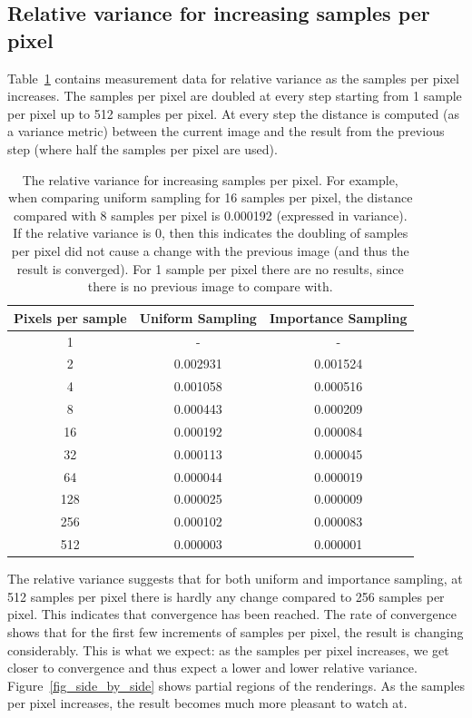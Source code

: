 \documentclass[11pt,a4paper]{report}
\begin{document}
\subsection{Relative variance for increasing samples per pixel}

Table~\ref{table_relative_variance} contains measurement data for relative variance as the samples per pixel increases. The samples per pixel are doubled at every step starting from 1 sample per pixel up to 512 samples per pixel. At every step the distance is computed (as a variance metric) between the current image and the result from the previous step (where half the samples per pixel are used).



\begin{table}
\begin{center}
\begin{tabular}{c|c|c}
Pixels per sample & Uniform Sampling & Importance Sampling \\
\hline \hline
1 & - & - \\
2 & 0.002931 & 0.001524 \\
4 & 0.001058 & 0.000516 \\
8 & 0.000443 & 0.000209 \\
16 & 0.000192 & 0.000084 \\
32 & 0.000113 & 0.000045 \\
64 & 0.000044 & 0.000019 \\
128 & 0.000025 & 0.000009 \\
256 & 0.000102 & 0.000083 \\
512 & 0.000003 & 0.000001 \\
\end{tabular}
\end{center}
\caption{The relative variance for increasing samples per pixel. For example, when comparing uniform sampling for 16 samples per pixel, the distance compared with 8 samples per pixel is 0.000192 (expressed in variance). If the relative variance is 0, then this indicates the doubling of samples per pixel did not cause a change with the previous image (and thus the result is converged). For 1 sample per pixel there are no results, since there is no previous image to compare with.}
\label{table_relative_variance}
\end{table}

The relative variance suggests that for both uniform and importance sampling, at 512 samples per pixel there is hardly any change compared to 256 samples per pixel. This indicates that convergence has been reached. The rate of convergence shows that for the first few increments of samples per pixel, the result is changing considerably. This is what we expect: as the samples per pixel increases, we get closer to convergence and thus expect a lower and lower relative variance. Figure~\ref{fig_side_by_side} shows partial regions of the renderings. As the samples per pixel increases, the result becomes much more pleasant to watch at. 
\end{document}

